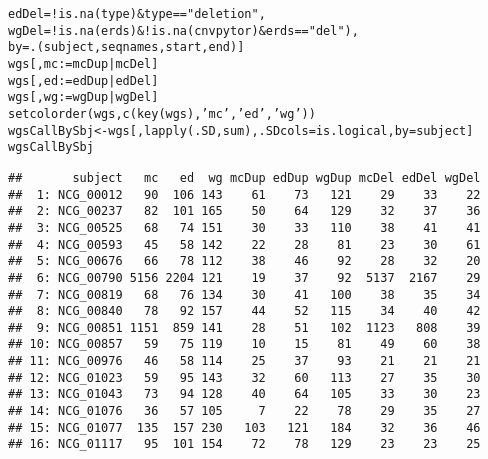 \documentclass{article}\usepackage[]{graphicx}\usepackage[]{color}
\makeatletter
\newcommand{\hlstr}[1]{\textcolor[rgb]{0.063,0.58,0.627}{#1}}%
\newcommand{\hlopt}[1]{\textcolor[rgb]{0.196,0.196,0.196}{#1}}%
\newcommand{\hlstd}[1]{\textcolor[rgb]{0.196,0.196,0.196}{#1}}%
\newcommand{\hlkwb}[1]{\textcolor[rgb]{0.627,0,0.314}{#1}}%
\newcommand{\hlkwc}[1]{\textcolor[rgb]{0,0.631,0.314}{#1}}%
\newcommand{\hlkwd}[1]{\textcolor[rgb]{0.78,0.227,0.412}{#1}}%
\newenvironment{kframe}{%
 \def\at@end@of@kframe{}%
 \ifinner\ifhmode%
  \def\at@end@of@kframe{\end{minipage}}%
  \begin{minipage}{\columnwidth}%
 \fi\fi%
 \def\FrameCommand##1{\hskip\@totalleftmargin \hskip-\fboxsep
 \colorbox{shadecolor}{##1}\hskip-\fboxsep
     \hskip-\linewidth \hskip-\@totalleftmargin \hskip\columnwidth}%
 \MakeFramed {\advance\hsize-\width
   \@totalleftmargin\z@ \linewidth\hsize
   \@setminipage}}%
 {\par\unskip\endMakeFramed%
 \at@end@of@kframe}
\newenvironment{knitrout}{}{} %
\makeatother
\begin{document}
\begin{knitrout}
\begin{kframe}
\begin{alltt}
             \hlkwc{edDel} \hlstd{=} \hlopt{!}\hlkwd{is.na}\hlstd{(type)} \hlopt{&} \hlstd{type} \hlopt{==} \hlstr{"deletion"}\hlstd{,}
             \hlkwc{wgDel} \hlstd{=} \hlopt{!}\hlkwd{is.na}\hlstd{(erds)} \hlopt{& !}\hlkwd{is.na}\hlstd{(cnvpytor)} \hlopt{&} \hlstd{erds} \hlopt{==} \hlstr{"del"}\hlstd{),}
           \hlkwc{by} \hlstd{=} \hlkwd{.}\hlstd{(subject, seqnames, start, end)]}
\hlstd{wgs[ , mc} \hlkwb{:=} \hlstd{mcDup} \hlopt{|} \hlstd{mcDel]}
\hlstd{wgs[ , ed} \hlkwb{:=} \hlstd{edDup} \hlopt{|} \hlstd{edDel]}
\hlstd{wgs[ , wg} \hlkwb{:=} \hlstd{wgDup} \hlopt{|} \hlstd{wgDel]}
\hlkwd{setcolorder}\hlstd{(wgs,} \hlkwd{c}\hlstd{(}\hlkwd{key}\hlstd{(wgs),} \hlstr{'mc'}\hlstd{,} \hlstr{'ed'}\hlstd{,} \hlstr{'wg'}\hlstd{))}
\hlstd{wgsCallBySbj} \hlkwb{<-} \hlstd{wgs[ ,} \hlkwd{lapply}\hlstd{(.SD, sum),} \hlkwc{.SDcols} \hlstd{= is.logical,} \hlkwc{by} \hlstd{= subject]}
\hlstd{wgsCallBySbj}
\end{alltt}
\begin{verbatim}
##       subject   mc   ed  wg mcDup edDup wgDup mcDel edDel wgDel
##  1: NCG_00012   90  106 143    61    73   121    29    33    22
##  2: NCG_00237   82  101 165    50    64   129    32    37    36
##  3: NCG_00525   68   74 151    30    33   110    38    41    41
##  4: NCG_00593   45   58 142    22    28    81    23    30    61
##  5: NCG_00676   66   78 112    38    46    92    28    32    20
##  6: NCG_00790 5156 2204 121    19    37    92  5137  2167    29
##  7: NCG_00819   68   76 134    30    41   100    38    35    34
##  8: NCG_00840   78   92 157    44    52   115    34    40    42
##  9: NCG_00851 1151  859 141    28    51   102  1123   808    39
## 10: NCG_00857   59   75 119    10    15    81    49    60    38
## 11: NCG_00976   46   58 114    25    37    93    21    21    21
## 12: NCG_01023   59   95 143    32    60   113    27    35    30
## 13: NCG_01043   73   94 128    40    64   105    33    30    23
## 14: NCG_01076   36   57 105     7    22    78    29    35    27
## 15: NCG_01077  135  157 230   103   121   184    32    36    46
## 16: NCG_01117   95  101 154    72    78   129    23    23    25
\end{verbatim}
\end{kframe}
\end{knitrout}
\end{document}
